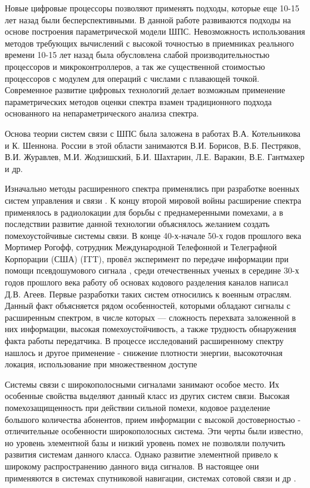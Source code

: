 Новые цифровые процессоры позволяют применять подходы, которые еще 10-15 лет назад были бесперспективными.
В данной работе развиваются подходы на основе построения параметрической модели ШПС. Невозможность использования
методов требующих вычислений с высокой точностью в приемниках реального времени
10-15 лет назад была обусловлена слабой производительностью процессоров и микроконтроллеров, а так же существенной
стоимостью процессоров с модулем для операций с числами с плавающей точкой. Современное развитие цифровых технологий делает 
возможным применение параметрических методов оценки спектра взамен традиционного подхода основанного на непараметрического
анализа спектра.

Основа теории систем связи с ШПС была заложена в работах В.А. Котельникова и К. Шеннона.
России в этой области занимаются В.И. Борисов, В.Б. Пестряков, В.И. Журавлев, М.И. Жодзишский, Б.И. Шахтарин, Л.Е.  Варакин, В.Е. Гантмахер и др.

Изначально методы расширенного спектра применялись при разработке военных систем управления и связи \cite{sklyar}.
К концу второй мировой войны расширение спектра применялось в радиолокации для борьбы с преднамеренными помехами, а
в последствии развитие данной технологии объяснялось желанием создать помехоустойчивые системы связи.
В конце 40-х-начале 50-х годов прошлого века Мортимер Рогофф, сотрудник Международной Телефонной и Телеграфной Корпорации (США) (ITT),
провёл эксперимент по передаче информации при помощи псевдошумового сигнала \cite{sklyar}, среди отечественных ученых
в середине 30-х годов прошлого века работу об основах кодового разделения каналов написал Д.В. Агеев.
Первые разработки таких систем относились к военным отраслям. Данный факт объясняется рядом особенностей, которыми обладают
сигналы с расширенным спектром, в числе которых — сложность перехвата заложенной в них информации,
высокая помехоустойчивость, а также трудность обнаружения факта работы передатчика. В процессе исследований расширенному спектру
нашлось и другое применение - снижение плотности энергии, высокоточная локация, использование при множественном доступе
\cite{sklyar}

Системы связи с широкополосными сигналами занимают особое место. Их особенные свойства выделяют данный класс из других систем
связи. Высокая помехозащищенность при действии сильной помехи, кодовое разделение большого количества абонентов, прием
информации с высокой достоверностью - отличительные особенности широкополосных система. Эти черты были известно, но
уровень элементной базы и низкий уровень помех не позволяли получить развития системам данного класса. Однако развитие
элементной привело к широкому распространению данного вида сигналов. В настоящее они применяются в системах спутниковой навигации,
системах сотовой связи и др \cite{varakin-book}.

